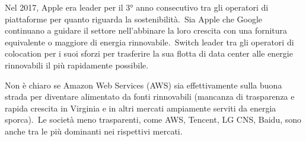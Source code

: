 \noindent Nel 2017, Apple era leader per il 3° anno consecutivo tra gli operatori di piattaforme per quanto riguarda la sostenibilità.\
Sia Apple che Google continuano a guidare il settore nell'abbinare la loro crescita con una fornitura equivalente o maggiore di energia rinnovabile.\
Switch leader tra gli operatori di colocation per i suoi sforzi per trasferire la sua flotta di data center alle energie rinnovabili il più rapidamente possibile.\

Non è chiaro se Amazon Web Services (AWS) sia effettivamente sulla buona strada per diventare alimentato da fonti rinnovabili (mancanza di trasparenza e rapida crescita in Virginia e in altri mercati ampiamente serviti da energia sporca).\
Le società meno trasparenti, come AWS, Tencent, LG CNS, Baidu, sono anche tra le più dominanti nei rispettivi mercati.\

